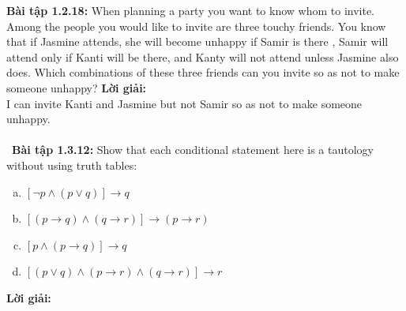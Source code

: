 \documentclass[a4paper]{article}
\begin{document}
\textbf{Bài tập 1.2.18:}  When planning a party you want to know whom to invite. Among the people you would like to invite are three touchy friends. You know that if Jasmine attends, she will become unhappy if Samir is there , Samir will attend only if Kanti will be there, and Kanty will not attend unless Jasmine also does. Which combinations of these three friends can you invite so as not to make someone unhappy? 
\textbf{Lời giải: } \\ I can invite Kanti and Jasmine but not Samir so as not to make someone unhappy.
   \\\ \\\
\textbf{Bài tập 1.3.12:} Show that each conditional statement here is a tautology without using truth tables: 
\begin{enumerate}[a)]
	\item $[\lnot p \land (p \lor q)] \rightarrow q$
	\item $[(p \rightarrow q) \land (q \rightarrow r)] \rightarrow (p \rightarrow r)$
	\item $[p \land (p \rightarrow q)] \rightarrow q$
	\item $[(p \lor q) \land (p \rightarrow r) \land (q \rightarrow r)] \rightarrow r$
\end{enumerate}
\textbf{Lời giải: }
\end{document}
